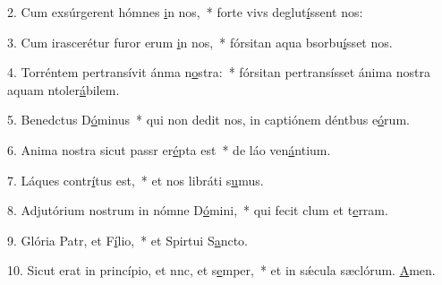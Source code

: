 2. Cum exsúrgerent hómnes \uline{i}n nos,~* forte vivs deglut\uline{í}ssent nos:\par 
3. Cum irascerétur furor erum \uline{i}n nos,~* fórsitan aqua bsorbu\uline{í}sset nos.\par 
4. Torréntem pertransívit ánma n\uline{o}stra:~* fórsitan pertransísset ánima nostra aquam ntoler\uline{á}bilem.\par 
5. Benedctus D\uline{ó}minus~* qui non dedit nos, in captiónem déntbus e\uline{ó}rum.\par 
6. Anima nostra sicut passr er\uline{é}pta est~* de láo ven\uline{á}ntium.\par 
7. Láques contr\uline{í}tus est,~* et nos libráti s\uline{u}mus.\par 
8. Adjutórium nostrum in nómne D\uline{ó}mini,~* qui fecit clum et t\uline{e}rram.\par 
9. Glória Patr, et F\uline{í}lio,~* et Spirtui S\uline{a}ncto.\par 
10. Sicut erat in princípio, et nnc, et s\uline{e}mper,~* et in sǽcula sæclórum. \uline{A}men.\par 
